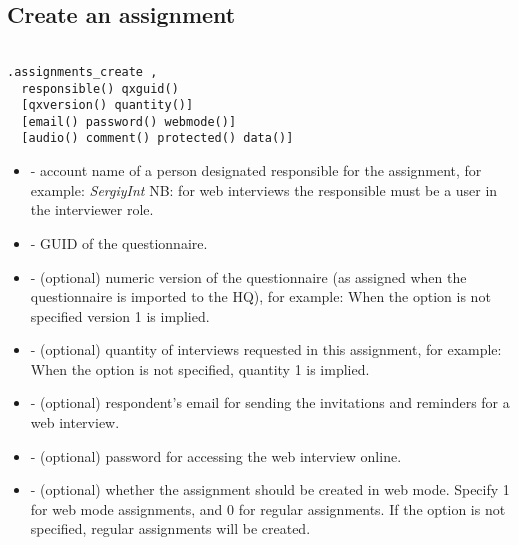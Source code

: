 \subsection{Create an assignment}

\begin{lstlisting}[style=CommandLineStyle, showlines=true]

.assignments_create ,
  responsible() qxguid()
  [qxversion() quantity()]
  [email() password() webmode()]
  [audio() comment() protected() data()]

\end{lstlisting}

\optsheader
\begin{itemize}

\item {} - account name of a person designated responsible
for the assignment, for example: \newline
\textit{SergiyInt}\newline
NB: for web interviews the responsible must be a user in the interviewer role.

\item {} - GUID of the questionnaire.

\item {} - (optional) numeric version of the questionnaire
      (as assigned when the questionnaire is imported to the HQ), for example:
       \newline
      When the option is not specified version 1 is implied.

\item {} - (optional) quantity of interviews requested in
      this assignment, for example:
      \newline
      When the option is not specified, quantity 1 is implied.

\item {} - (optional) respondent's email for sending the
      invitations and reminders for a web interview.

\item {} - (optional) password for accessing the web interview
      online.

\item {} - (optional) whether the assignment should be
      created in web mode. Specify 1 for web mode assignments, and 0 for regular
      assignments. If the option is not specified, regular assignments will be
      created.


\end{itemize}
